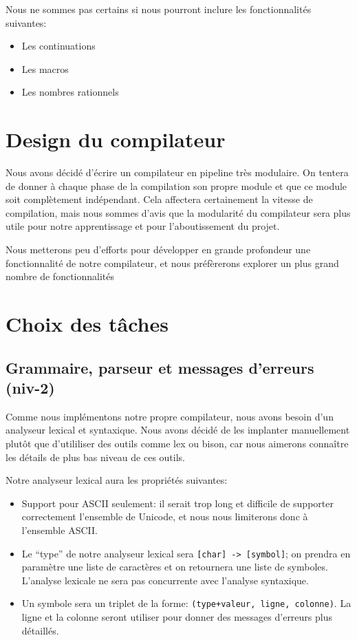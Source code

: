 \documentclass[11pt]{article}
\begin{document}
Nous ne sommes pas certains si nous pourront inclure les
fonctionnalités suivantes:

\begin{itemize}
\item Les continuations
\item Les macros
\item Les nombres rationnels
\end{itemize}


\section{Design du compilateur}

Nous avons décidé d'écrire un compilateur en pipeline très modulaire.
On tentera de donner à chaque phase de la compilation son propre
module et que ce module soit complètement indépendant.  Cela affectera
certainement la vitesse de compilation, mais nous sommes d'avis que la
modularité du compilateur sera plus utile pour notre apprentissage et
pour l'aboutissement du projet.

Nous metterons peu d'efforts pour développer en grande profondeur une
fonctionnalité de notre compilateur, et nous préfèrerons explorer un
plus grand nombre de fonctionnalités


\section{Choix des tâches}

\subsection{Grammaire, parseur et messages d'erreurs (niv-2)}

Comme nous implémentons notre propre compilateur, nous avons besoin
d'un analyseur lexical et syntaxique.  Nous avons décidé de les
implanter manuellement plutôt que d'utililiser des outils comme lex ou
bison, car nous aimerons connaître les détails de plus bas niveau de
ces outils.

Notre analyseur lexical aura les propriétés suivantes:


\begin{itemize}
\item Support pour ASCII seulement: il serait trop long et difficile
  de supporter correctement l'ensemble de Unicode, et nous nous
  limiterons donc à l'ensemble ASCII.
\item Le ``type'' de notre analyseur lexical sera \texttt{[char] ->
    [symbol]}; on prendra en paramètre une liste de caractères et on
  retournera une liste de symboles.  L'analyse lexicale ne sera pas
  concurrente avec l'analyse syntaxique.
\item Un symbole sera un triplet de la forme: \texttt{(type+valeur,
    ligne, colonne)}.  La ligne et la colonne seront utiliser pour
  donner des messages d'erreurs plus détaillés.
\end{itemize}
\end{document}
